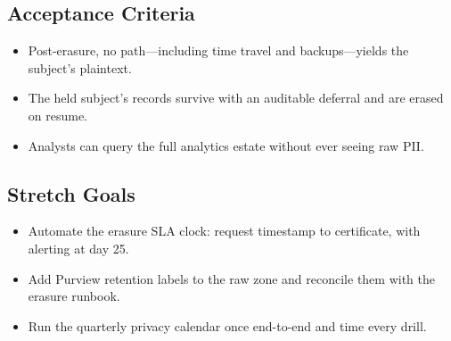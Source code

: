 \subsection*{Acceptance Criteria}
\begin{itemize}
    \item Post-erasure, no path---including time travel and backups---yields the subject's plaintext.
    \item The held subject's records survive with an auditable deferral and are erased on resume.
    \item Analysts can query the full analytics estate without ever seeing raw PII.
\end{itemize}

\subsection*{Stretch Goals}
\begin{itemize}
    \item Automate the erasure SLA clock: request timestamp to certificate, with alerting at day 25.
    \item Add Purview retention labels to the raw zone and reconcile them with the erasure runbook.
    \item Run the quarterly privacy calendar once end-to-end and time every drill.
\end{itemize}
